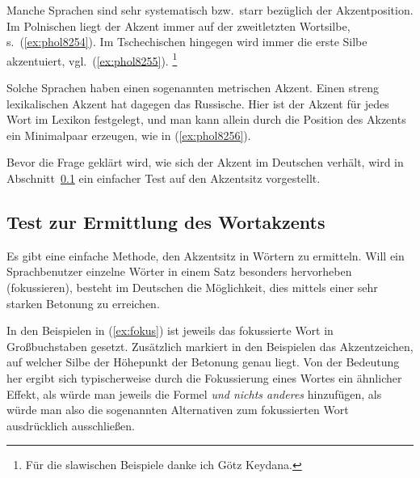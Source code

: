 \enlargethispage{1\baselineskip}
Manche Sprachen sind sehr systematisch bzw.\ starr bezüglich der Akzentposition.
Im Polnischen liegt der Akzent immer auf der zweitletzten Wortsilbe, s.\ (\ref{ex:phol8254}).
Im Tschechischen hingegen wird immer die erste Silbe akzentuiert, vgl.\ (\ref{ex:phol8255}).%
\footnote{Für die slawischen Beispiele danke ich Götz Keydana.}

\begin{exe}
\end{exe}

Solche Sprachen haben einen sogenannten metrischen Akzent.
Einen streng lexikalischen Akzent hat dagegen das Russische.
Hier ist der Akzent für jedes Wort im Lexikon festgelegt, und man kann allein durch die Position des Akzents ein Minimalpaar erzeugen, wie in (\ref{ex:phol8256}).

\begin{exe}
\end{exe}

Bevor die Frage geklärt wird, wie sich der Akzent im Deutschen verhält, wird in Abschnitt~\ref{sec:akzentsitztest} ein einfacher Test auf den Akzentsitz vorgestellt.

\subsection{Test zur Ermittlung des Wortakzents}

\label{sec:akzentsitztest}



Es gibt eine einfache Methode, den Akzentsitz in Wörtern zu ermitteln.
Will ein Sprachbenutzer einzelne Wörter in einem Satz besonders hervorheben (fokussieren), besteht im Deutschen die Möglichkeit, dies mittels einer sehr starken Betonung zu erreichen.

\begin{exe}
  \ex\label{ex:fokus}
  \begin{xlist}
  \end{xlist}
\end{exe}

In den Beispielen in (\ref{ex:fokus}) ist jeweils das fokussierte Wort in Großbuchstaben gesetzt.
Zusätzlich markiert in den Beispielen das Akzentzeichen, auf welcher Silbe der Höhepunkt der Betonung genau liegt.
Von der Bedeutung her ergibt sich typischerweise durch die Fokussierung eines Wortes ein ähnlicher Effekt, als würde man jeweils die Formel \textit{und nichts anderes} hinzufügen, als würde man also die sogenannten Alternativen zum fokussierten Wort ausdrücklich ausschließen.

